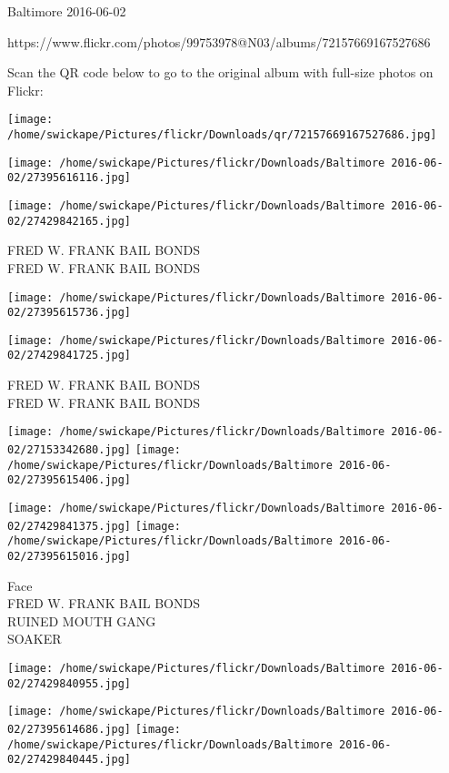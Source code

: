 \documentclass[10pt,letterpaper]{article}
\begin{document}
Baltimore 2016-06-02

https://www.flickr.com/photos/99753978@N03/albums/72157669167527686

Scan the QR code below to go to the original album with full-size photos on Flickr:

\texttt{[image: /home/swickape/Pictures/flickr/Downloads/qr/72157669167527686.jpg]}
\pagebreak

\texttt{[image: /home/swickape/Pictures/flickr/Downloads/Baltimore 2016-06-02/27395616116.jpg]}

\vspace{0.25in}
\texttt{[image: /home/swickape/Pictures/flickr/Downloads/Baltimore 2016-06-02/27429842165.jpg]}

FRED W. FRANK BAIL BONDS\\
FRED W. FRANK BAIL BONDS\\
\pagebreak

\texttt{[image: /home/swickape/Pictures/flickr/Downloads/Baltimore 2016-06-02/27395615736.jpg]}

\vspace{0.25in}
\texttt{[image: /home/swickape/Pictures/flickr/Downloads/Baltimore 2016-06-02/27429841725.jpg]}

FRED W. FRANK BAIL BONDS\\
FRED W. FRANK BAIL BONDS\\
\pagebreak

\texttt{[image: /home/swickape/Pictures/flickr/Downloads/Baltimore 2016-06-02/27153342680.jpg]}
\texttt{[image: /home/swickape/Pictures/flickr/Downloads/Baltimore 2016-06-02/27395615406.jpg]}

\texttt{[image: /home/swickape/Pictures/flickr/Downloads/Baltimore 2016-06-02/27429841375.jpg]}
\texttt{[image: /home/swickape/Pictures/flickr/Downloads/Baltimore 2016-06-02/27395615016.jpg]}

Face\\
FRED W. FRANK BAIL BONDS\\
RUINED MOUTH GANG\\
SOAKER\\
\pagebreak

\texttt{[image: /home/swickape/Pictures/flickr/Downloads/Baltimore 2016-06-02/27429840955.jpg]}

\vspace{0.25in}
\texttt{[image: /home/swickape/Pictures/flickr/Downloads/Baltimore 2016-06-02/27395614686.jpg]}
\texttt{[image: /home/swickape/Pictures/flickr/Downloads/Baltimore 2016-06-02/27429840445.jpg]}
\end{document}
